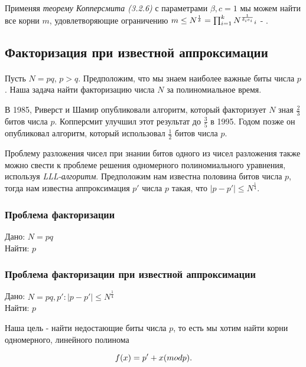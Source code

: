   Применяя \textit{теорему Копперсмита (3.2.6)} с параметрами {$\beta,c=1$} мы можем найти все корни {$m$}, удовлетворяющие ограничению
  {$m \le N^\frac{1}{\delta} = \prod_{i=1}^{k}{N\textsuperscript{{$\frac{1}{\delta_i e_i}$}}_i}$} - \cite[страницы 331-333]{may10}.

\subsection{Факторизация при известной аппроксимации}

\paragraph{} Пусть {$N = pq$}, {$p > q$}. Предположим, что мы знаем наиболее важные биты числа {$p$}. Наша задача найти факторизацию числа
  {$N$} за полиномиальное время.
  
  В 1985, Риверст и Шамир опубликовали алгоритм, который факторизует {$N$} зная {$\frac{2}{3}$} битов числа {$p$}. Копперсмит улучшил этот результат
  до {$\frac{3}{5}$} в 1995. Годом позже он опубликовал алгоритм, который использовал {$\frac{1}{2}$} битов числа {$p$}.
  
  Проблему разложения чисел при знании битов одного из чисел разложения также можно свести к проблеме решения одномерного полиномиального
  уравнения, используя \textit{LLL-алгоритм}. Предположим нам известна половина битов числа {$p$}, тогда нам известна аппроксимация {$p'$}
  числа {$p$} такая, что {$|p-p'| \le N^\frac{1}{4}$}.
  
  \subsubsection{Проблема факторизации}
  Дано: {$N = p q$} \\   
  Найти: {$p$}  
  
  \subsubsection{Проблема факторизации при известной аппроксимации}
  Дано: {$ N = p q, p': |p-p'| \le N^\frac{1}{4} $} \\   
  Найти: {$p$}  
  
  Наша цель - найти недостающие биты числа {$p$}, то есть мы хотим найти корни одномерного, линейного полинома
  
    \begin{equation}
     \textit{{$ f(x) = p' + x (mod p) $}}.
    \end{equation}

